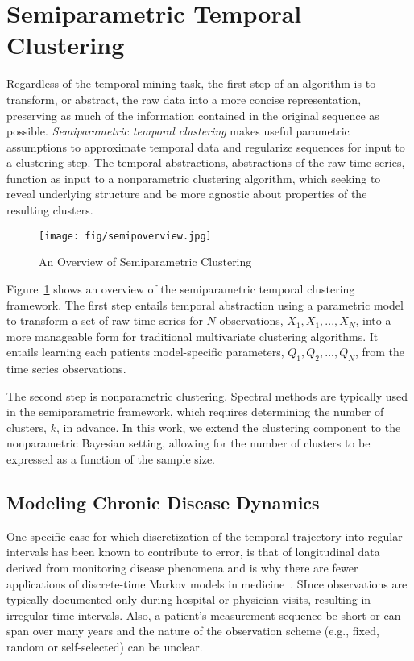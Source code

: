 \section{Semiparametric Temporal Clustering}
Regardless of the temporal mining task, the first step of an algorithm is to transform, or abstract, the raw data into a more concise representation, preserving as much of the information contained in the original sequence as possible.  \emph{Semiparametric temporal clustering} makes useful parametric assumptions to approximate temporal data and regularize sequences for input to a clustering step.  The temporal abstractions, abstractions of the raw time-series, function as input to a nonparametric clustering algorithm, which seeking to reveal underlying structure and be more agnostic about properties of the resulting clusters.

\begin{figure}[t]
\vskip 0.2in
\begin{center}
\centerline{\texttt{[image: fig/semipoverview.jpg]}}
\caption{An Overview of Semiparametric Clustering}
\label{semipoverview}
\end{center}
\vskip -0.2in
\end{figure}

Figure~\ref{semipoverview} shows an overview of the semiparametric temporal clustering framework. The first step entails temporal abstraction using a parametric model to transform a set of raw time series for $N$ observations, $X_1, X_1,...,X_N$, into a more manageable form for traditional multivariate clustering algorithms. It entails learning each patients model-specific parameters, $Q_1, Q_2, ..., Q_N$, from the time series observations.

The second step is nonparametric clustering. Spectral methods are typically used in the semiparametric framework, which requires determining the number of clusters, $k$, in advance. In this work, we extend the
clustering component to the nonparametric Bayesian setting, allowing for the number of clusters to be expressed as a function of the sample size.

\subsection{Modeling Chronic Disease Dynamics}
One specific case for which discretization of the temporal trajectory into regular intervals has been known to contribute to error, is that of longitudinal data derived from monitoring disease phenomena and is why there are fewer applications of discrete-time Markov models in medicine~\cite{Jackson2011}.  SInce observations are typically documented only during hospital or physician visits, resulting in irregular time intervals.  Also, a patient's measurement sequence be short or can span over many years and the nature of the observation scheme (e.g., fixed, random or self-selected) can be unclear.

